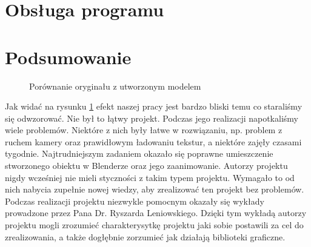 \documentclass[a4paper,12pt]{article}
\numberwithin{equation}{section}
\begin{document}
\section{Obsługa programu}
\section{Podsumowanie}
\begin{figure}[h!]
    \centering
    \caption{Porównanie oryginału z utworzonym modelem}
    \label{fig:furgon}
\end{figure}

Jak widać na rysunku \ref{fig:furgon} efekt naszej pracy jest bardzo bliski temu co staraliśmy się odwzorować. Nie był to łątwy projekt. Podczas jego realizacji napotkaliśmy wiele problemów. Niektóre z nich były łatwe w rozwiązaniu, np. problem z ruchem kamery oraz prawidłowym ładowaniu tekstur, a niektóre zajęły czasami tygodnie. Najtrudniejszym zadaniem okazało się poprawne umieszczenie stworzonego obiektu w Blenderze oraz jego zaanimowanie. Autorzy projektu nigdy wcześniej nie mieli styczności z takim typem projektu. Wymagało to od nich nabycia zupełnie nowej wiedzy, aby zrealizować ten projekt bez problemów.
\newline
\indent Podczas realizacji projektu niezwykle pomocnym okazały się wykłady prowadzone przez Pana Dr. Ryszarda Leniowskiego. Dzięki tym wykładą autorzy projektu mogli zrozumieć charakterysytkę projektu jaki sobie postawili za cel do zrealizowania, a także dogłębnie zorzumieć jak działają biblioteki graficzne.
\end{document}
